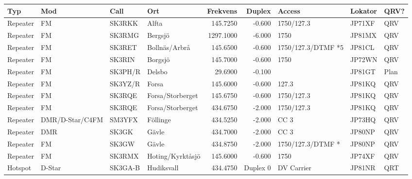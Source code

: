 \begin{landscape}
\begin{longtable}{llllrrlll}
	\bf Typ  & \bf Mod         & \bf Call & \bf Ort               & \bf Frekvens & \bf Duplex & \bf Access         & \bf Lokator & \bf QRV? \\ \hline
	\endhead
	Repeater & FM              & SK3RKK   & Alfta                 &     145.7250 &     -0.600 & 1750/127.3         & JP71XF      & QRV      \\
	Repeater & FM              & SK3RMG   & Bergsjö               &    1297.1000 &     -6.000 & 1750               & JP81MX      & QRV      \\
	Repeater & FM              & SK3RET   & Bollnäs/Arbrå         &     145.6500 &     -0.600 & 1750/127.3/DTMF *5 & JP81CL      & QRV      \\
	Repeater & FM              & SK3RIN   & Borgsjö               &     145.7000 &     -0.600 & 1750               & JP72WN      & QRV      \\
	Repeater & FM              & SK3PH/R  & Delsbo                &      29.6900 &     -0.100 &                    & JP81GT      & Plan     \\
	Repeater & FM              & SK3YZ/R  & Forsa                 &     145.6000 &     -0.600 & 127.3              & JP81KQ      & QRV      \\
	Repeater & FM              & SK3RQE   & Forsa/Storberget      &     145.6750 &     -0.600 & 1750/127.3         & JP81KQ      & QRV      \\
	Repeater & FM              & SK3RQE   & Forsa/Storberget      &     434.6750 &     -2.000 & 1750/127.3         & JP81KQ      & QRV      \\
	Repeater & DMR/D-Star/C4FM & SM3YFX   & Föllinge              &     434.5250 &     -2.000 & CC 3               & JP73HQ      & QRV      \\
	Repeater & DMR             & SK3GK    & Gävle                 &     434.7000 &     -2.000 & CC 3               & JP80NP      & QRV      \\
	Repeater & FM              & SK3GW    & Gävle                 &     434.8750 &     -2.000 & 1750/127.3/DTMF *  & JP80NP      & QRV      \\
	Repeater & FM              & SK3RMX   & Hoting/Kyrktåsjö      &     145.6000 &     -0.600 & 1750               & JP74XF      & QRV      \\
	Hotspot  & D-Star          & SK3GA-B  & Hudiksvall            &     434.4750 &   Duplex 0 & DV Carrier         & JP81NR      & QRT      \\

\end{longtable}
\end{landscape}
